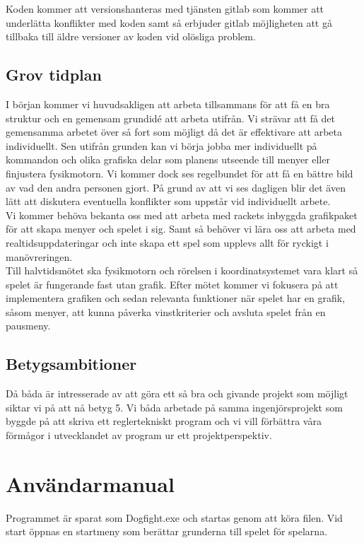 \documentclass[12pt,a4paper]{article}
\begin{document}
Koden kommer att versionshanteras med tjänsten gitlab som kommer att underlätta konflikter med koden samt så erbjuder gitlab möjligheten att gå tillbaka till äldre versioner av koden vid olösliga problem.

\subsection{Grov tidplan}
I början kommer vi huvudsakligen att arbeta tillsammans för att få en bra struktur och en gemensam grundidé att arbeta utifrån. Vi strävar att få det gemensamma arbetet över så fort som möjligt då det är effektivare att arbeta individuellt. Sen utifrån grunden kan vi börja jobba mer individuellt på kommandon och olika grafiska delar som planens utseende till menyer eller finjustera fysikmotorn. Vi kommer dock ses regelbundet för att få en bättre bild av vad den andra personen gjort. På grund av att vi ses dagligen blir det även lätt att diskutera eventuella konflikter som uppstår vid individuellt arbete. \\

Vi kommer behöva bekanta oss med att arbeta med rackets inbyggda grafikpaket för att skapa menyer och spelet i sig. Samt så behöver vi lära oss att arbeta med realtidsuppdateringar och inte skapa ett spel som upplevs allt för ryckigt i manövreringen. \\

Till halvtidsmötet ska fysikmotorn och rörelsen i koordinatsystemet vara klart så spelet är fungerande fast utan grafik. Efter mötet kommer vi fokusera på att implementera grafiken och sedan relevanta funktioner när spelet har en grafik, såsom menyer, att kunna påverka vinstkriterier och avsluta spelet från en pausmeny.

\subsection{Betygsambitioner}
Då båda är intresserade av att göra ett så bra och givande projekt som möjligt siktar vi på att nå betyg 5. Vi båda arbetade på samma ingenjörsprojekt som byggde på att skriva ett reglertekniskt program och vi vill förbättra våra förmågor i utvecklandet av program ur ett projektperspektiv. 

\section{Användarmanual}\label{Användarmanual}
Programmet är sparat som Dogfight.exe och startas genom att köra filen. Vid start öppnas en startmeny som berättar grunderna till spelet för spelarna. \\
\end{document}
